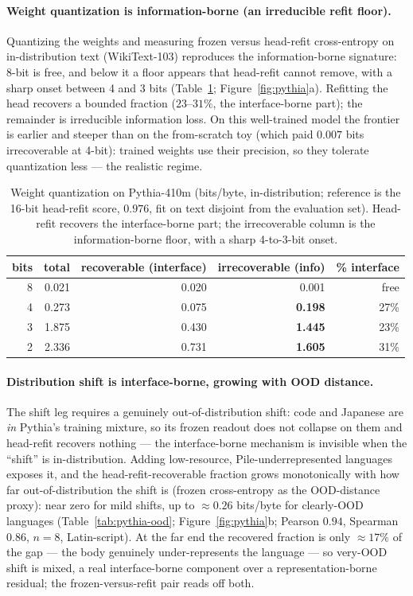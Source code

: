 \documentclass[twocolumn,10pt]{article}
\theoremstyle{definition}
\theoremstyle{remark}
\begin{document}
\paragraph{Weight quantization is information-borne (an irreducible refit floor).}
Quantizing the weights and measuring frozen versus head-refit cross-entropy on
in-distribution text (WikiText-103) reproduces the information-borne signature:
8-bit is free, and below it a floor appears that head-refit cannot remove, with
a sharp onset between 4 and 3 bits (Table~\ref{tab:pythia-quant}; Figure~\ref{fig:pythia}a). Refitting the
head recovers a bounded fraction ($23$--$31\%$, the
interface-borne part); the remainder is irreducible information loss. On this
well-trained model the frontier is earlier and steeper than on the from-scratch
toy (which paid $0.007$ bits irrecoverable at 4-bit): trained weights use their
precision, so they tolerate quantization less --- the realistic regime.

\begin{table}[t]
\centering\small
\begin{tabular}{r r r r r}
\hline
bits & total & recoverable (interface) & irrecoverable (info) & \% interface\\
\hline
8 & 0.021 & 0.020 & 0.001 & free\\
4 & 0.273 & 0.075 & \textbf{0.198} & 27\%\\
3 & 1.875 & 0.430 & \textbf{1.445} & 23\%\\
2 & 2.336 & 0.731 & \textbf{1.605} & 31\%\\
\hline
\end{tabular}
\caption{Weight quantization on Pythia-410m (bits/byte, in-distribution;
reference is the 16-bit head-refit score, $0.976$, fit on text disjoint from
the evaluation set). Head-refit recovers the
interface-borne part; the irrecoverable column is the information-borne floor,
with a sharp 4-to-3-bit onset.}
\label{tab:pythia-quant}
\end{table}

\paragraph{Distribution shift is interface-borne, growing with OOD distance.}
The shift leg requires a genuinely out-of-distribution shift: code and Japanese
are \emph{in} Pythia's training mixture, so its frozen readout does not collapse
on them and head-refit recovers nothing --- the interface-borne mechanism is
invisible when the ``shift'' is in-distribution. Adding low-resource,
Pile-underrepresented languages exposes it, and the head-refit-recoverable
fraction grows monotonically with how far out-of-distribution the shift is
(frozen cross-entropy as the OOD-distance proxy): near zero for mild shifts, up
to $\approx 0.26$ bits/byte for clearly-OOD languages
(Table~\ref{tab:pythia-ood}; Figure~\ref{fig:pythia}b; Pearson $0.94$, Spearman $0.86$, $n=8$,
Latin-script). At the far end the recovered fraction is only $\approx 17\%$ of
the gap --- the body genuinely under-represents the language --- so very-OOD
shift is mixed, a real interface-borne component over a representation-borne
residual; the frozen-versus-refit pair reads off both.
\end{document}
